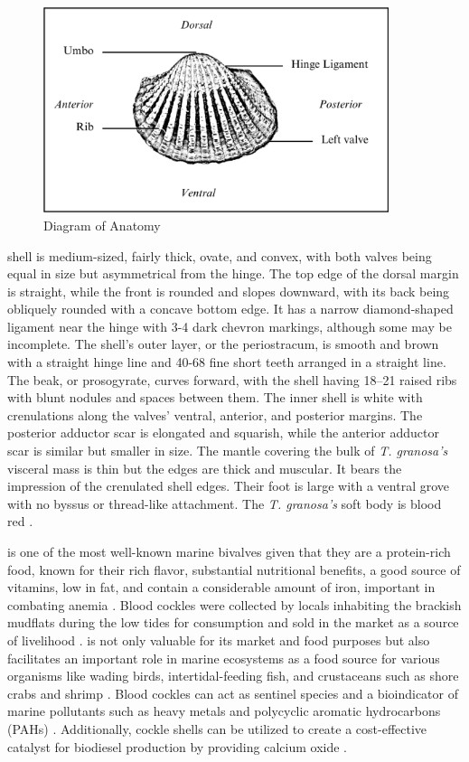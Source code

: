 \begin{figure}[!htbp]
	\centering
	\includegraphics[width=0.9\textwidth]{figures/anatomy.png}
	\caption{Diagram of \Tegillarcagranosa Anatomy}
\end{figure}

\textit{\Tgranosa} shell is medium-sized, fairly thick, ovate, and convex, with both valves being equal in size but asymmetrical from the hinge. The top edge of the dorsal margin is straight, while the front is rounded and slopes downward, with its back being obliquely rounded with a concave bottom edge. It has a narrow diamond-shaped ligament near the hinge with 3-4 dark chevron markings, although some may be incomplete. The shell’s outer layer, or the periostracum, is smooth and brown with a straight hinge line and 40-68 fine short teeth arranged in a straight line. The beak, or prosogyrate, curves forward, with the shell having 18–21 raised ribs with blunt nodules and spaces between them. The inner shell is white with crenulations along the valves' ventral, anterior, and posterior margins. The posterior adductor scar is elongated and squarish, while the anterior adductor scar is similar but smaller in size. The mantle covering the bulk of \textit{T. granosa’s} visceral mass is thin but the edges are thick and muscular. It bears the impression of the crenulated shell edges. Their foot is large with a ventral grove with no byssus or thread-like attachment. The  \textit{T. granosa’s} soft body is blood red \cite{narasimham1988}.  

\Tgranosa is one of the most well-known marine bivalves given that they are a protein-rich food, known for their rich flavor, substantial nutritional benefits, a good source of vitamins, low in fat, and contain a considerable amount of iron, important in combating anemia \cite{zha2022}. Blood cockles were collected by locals inhabiting the brackish mudflats during the low tides for consumption and sold in the market as a source of livelihood \cite{miranda2023}. \Tgranosa is not only valuable for its market and food purposes but also facilitates an important role in marine ecosystems as a food source for various organisms like wading birds, intertidal-feeding fish, and crustaceans such as shore crabs and shrimp \cite{burdon2014}. Blood cockles can act as sentinel species and a bioindicator of marine pollutants such as heavy metals \cite{ishak2016} and polycyclic aromatic hydrocarbons (PAHs) \cite{sany2014}. Additionally, cockle shells can be utilized to create a cost-effective catalyst for biodiesel production by providing calcium oxide \cite{boey2011waste}.

